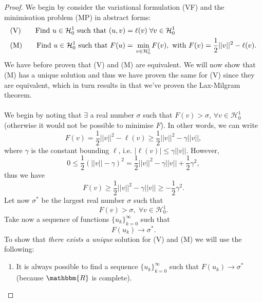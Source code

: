\documentclass[12pt, a4paper]{article}
\newcommand{\R}{\ensuremath{\mathbbm{R}}}
\numberwithin{equation}{section}
\begin{document}
\begin{proof}
We begin by consider the variational formulation (VF) and the minimisation problem (MP) in abstract forms:
\begin{equation*}
\begin{split}
&\text{(V)} \qquad \text{Find } u\in \mathcal{H}_0^1 \text{ such that } (u,v)=\ell(v)\; \forall v\in \mathcal{H}_0^1 \\
&\text{(M)} \qquad \text{Find } u\in \mathcal{H}_0^1 \text{ such that } F(u) = \underset{v\in\mathcal{H}_0^1}{\text{\normalfont{ min }}} F(v), \text{ with } F(v) = \frac{1}{2}||v||^2 - \ell (v).
\end{split}
\end{equation*}
We have before proven that (V) and (M) are equivalent. We will now show that (M) has a unique solution and thus we have proven the same for (V) since they are equivalent, which in turn results in that we've proven the Lax-Milgram theorem.
\\\\
We begin by noting that $\exists$ a real number $\sigma$ such that $F(v)>\sigma$, $\forall v \in \mathcal{H}_0^1$ (otherwise it would not be possible to minimise $F$). In other words, we can write
\begin{equation*}
F(v) = \frac{1}{2}||v||^2 - \ell(v) \geq \frac{1}{2}||v||^2 - \gamma ||v||,
\end{equation*}
where $\gamma$ is the constant bounding $\ell$, i.e. $|\ell(v)|\leq\gamma ||v||$. However,
\begin{equation*}
0\leq \frac{1}{2}(||v||-\gamma)^2 = \frac{1}{2} ||v||^2-\gamma ||v|| + \frac{1}{2}\gamma^2,
\end{equation*}
thus we have
\begin{equation*}
F(v) \geq \frac{1}{2}||v||^2-\gamma ||v|| \geq -\frac{1}{2}\gamma^2.
\end{equation*}
Let now $\sigma^*$ be the largest real number $\sigma$ such that
\begin{equation}
\label{fyris}
F(v) > \sigma, \; \forall v \in \mathcal{H}_0^1.
\end{equation}
Take now a sequence of  functions $\{u_k\}_{k=0}^\infty$ such that
\begin{equation}
\label{sekv}
F(u_k) \to \sigma^*.
\end{equation}
To show that \textit{there exists a unique} solution for (V) and (M) we will use the following:
\begin{enumerate}[label=(\roman*)]
\item It is always possible to find a sequence $\{u_k\}_{k=0}^\infty$ such that $F(u_k) \to \sigma^*$ (because $\R$ is complete).

\end{enumerate}
\end{proof}
\end{document}
